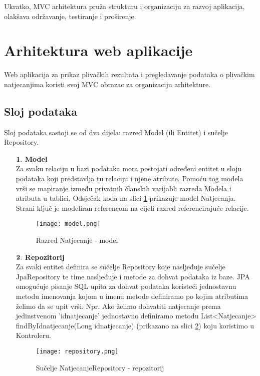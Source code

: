 \documentclass[times, utf8, zavrsni]{fer}
\begin{document}
\noindent Ukratko, MVC arhitektura pruža strukturu i organizaciju za razvoj aplikacija, olakšava održavanje, testiranje i proširenje.


\section{Arhitektura web aplikacije}

Web aplikacija za prikaz plivačkih rezultata i pregledavanje podataka o plivačkim natjecanjima koristi svoj MVC obrazac
za organizaciju arhitekture.

\subsection{Sloj podataka}
Sloj podataka sastoji se od dva dijela: razred Model (ili Entitet) i sučelje Repository.

\begin{enumerate}

    \item[$\textbf1.$] \textbf{Model} \\
    Za svaku relaciju u bazi podataka mora postojati određeni entitet u sloju podataka koji predstavlja tu relaciju i njene atribute.
    Pomoću tog modela vrši se mapiranje između privatnih članskih varijabli razreda Modela i atributa u tablici. Odsječak koda na slici
    \ref{fig:model} prikazuje model Natjecanja. Strani ključ je modeliran referencom na cijeli razred referencirajuće relacije. 

    \begin{figure}[!h]
        \centering
        \texttt{[image: model.png]}
        \centering
        \caption{Razred Natjecanje - model}
        \label{fig:model}
    \end{figure}

    \item[$\textbf2.$] \textbf{Repozitorij} \\
    Za svaki entitet definira se sučelje Repository koje nasljeđuje sučelje JpaRepository te time nasljeđuje i metode za dohvat
    podataka iz baze. JPA omogućuje pisanje SQL upita za dohvat podataka koristeći jednostavnu metodu imenovanja kojom u imenu metode
    definiramo po kojim atributima želimo da se upit vrši. Npr. Ako želimo dohvatiti natjecanje prema jedinstvenom 'idnatjecanje' 
    jednostavno definiramo metodu List<Natjecanje> findByIdnatjecanje(Long idnatjecanje) (prikazano na slici \ref{fig:repository}) koju koristimo u Kontroleru. 

    \begin{figure}[!h]
        \centering
        \texttt{[image: repository.png]}
        \centering
        \caption{Sučelje NatjecanjeRepository - repozitorij}
        \label{fig:repository}
    \end{figure}

\end{enumerate}
\end{document}
